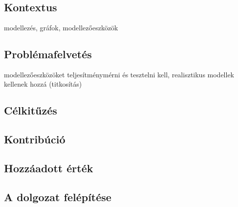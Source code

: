 \chapter{\bevezetes}

\section{Kontextus}
modellezés, gráfok, modellezőeszközök

\section{Problémafelvetés}
modellezőeszközöket teljesítménymérni és tesztelni kell,
realisztikus modellek kellenek hozzá (titkosítás)

\section{Célkitűzés}

\section{Kontribúció}

\section{Hozzáadott érték}

\section{A dolgozat felépítése}